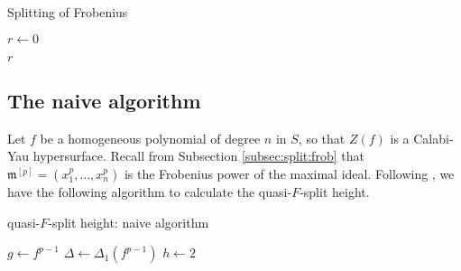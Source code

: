 \begin{algorithm}[H]
\caption{Splitting of Frobenius}
\label{alg:naive:u}
$r \gets 0$\;


\Return $r$
\end{algorithm}

\subsection{The naive algorithm}

Let \(f\) be a homogeneous polynomial of degree \(n\) 
in \(S\), 
so that \(Z(f)\) is a Calabi-Yau hypersurface.
Recall from Subsection \ref{subsec:split:frob} that
\(\mathfrak{m}^{[p]} = (x_{1}^{p}, \ldots, x_{n}^{p})\)
is the Frobenius power of the maximal ideal.
Following \cite{kty-2022-fedder}, we have the following
algorithm to calculate the quasi-\(F\)-split height.

\begin{algorithm}[H]
\caption{quasi-\(F\)-split height: naive algorithm}
\label{alg:qfs:naive}
$g \gets f^{p - 1}$\;
$\Delta \gets \Delta_1(f^{p-1})$\;
$h \gets 2$\;
\end{algorithm}

